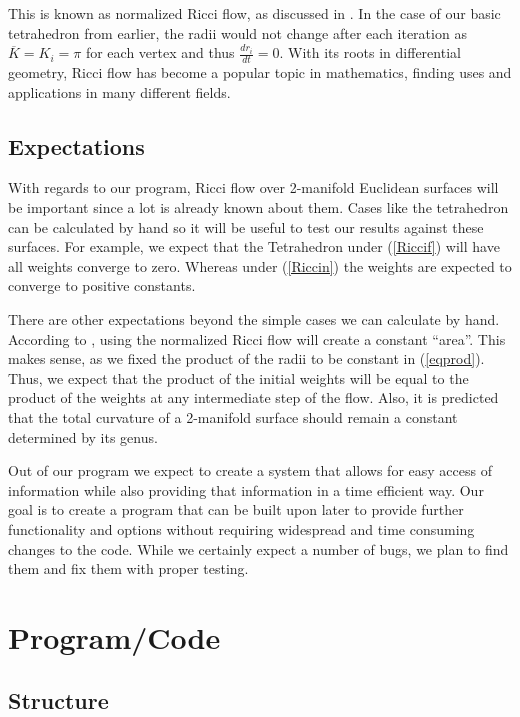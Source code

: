 \documentclass[12pt]{article}
\begin{document}
\noindent This is known as normalized Ricci flow, as discussed in \cite{chowluo}. In the case of our basic tetrahedron from earlier, the radii would not change after each iteration as $\overline{K} = K_i = \pi$ for each vertex and thus $\displaystyle\frac{dr_i}{dt} = 0$. With its roots in differential geometry, Ricci flow has become a popular topic in mathematics, finding uses and applications in many different fields. 

\subsection{Expectations}

With regards to our program, Ricci flow over 2-manifold Euclidean surfaces will be important since a lot is already known about them. Cases like the tetrahedron can be calculated by hand so it will be useful to test our results against these surfaces. For example, we expect that the Tetrahedron under (\ref{Riccif}) will have all weights converge to zero. Whereas under (\ref{Riccin}) the weights are expected to converge to positive constants.\newline

\noindent There are other expectations beyond the simple cases we can calculate by hand. According to \cite{chowluo}, using the normalized Ricci flow will create a constant ``area''. This makes sense, as we fixed the product of the radii to be constant in (\ref{eqprod}). Thus, we expect that the product of the initial weights will be equal to the product of the weights at any intermediate step of the flow. Also, it is predicted that the total curvature of a 2-manifold surface should remain a constant determined by its genus.\newline

\noindent Out of our program we expect to create a system that allows for easy access of information while also providing that information in a time efficient way. Our goal is to create a program that can be built upon later to provide further functionality and options without requiring widespread and time consuming changes to the code. While we certainly expect a number of bugs, we plan to find them and fix them with proper testing.

\section{Program/Code}
\subsection{Structure}
\end{document}
